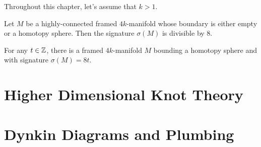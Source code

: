 \begin{convention*}
  Throughout this chapter, let's assume that $k>1$.
\end{convention*}

\begin{theorem}\label{thm:signature_divisible_by_8}
  Let $M$ be a highly-connected framed $4k$-manifold whose boundary is either empty or a homotopy sphere. Then the signature $\sigma(M)$ is divisible by $8$.
\end{theorem}

\begin{theorem}\label{thm:signature_8_existence_theorem}
  For any $t\in \mathbb{Z}$, there is a framed $4k$-manifold $M$ bounding a homotopy sphere and with signature $\sigma(M)=8t$.
\end{theorem}

\section{Higher Dimensional Knot Theory}

\section{Dynkin Diagrams and Plumbing}
